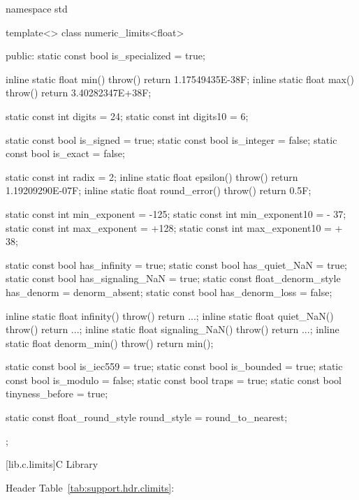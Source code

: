 \pnum
\enterexample
\begin{codeblock}
namespace std {
  template<> class numeric_limits<float> {
  public:
    static const bool is_specialized = true;

    inline static float min() throw() { return 1.17549435E-38F; }
    inline static float max() throw() { return 3.40282347E+38F; }

    static const int digits   = 24;
    static const int digits10 =  6;

    static const bool is_signed  = true;
    static const bool is_integer = false;
    static const bool is_exact   = false;

    static const int radix = 2;
    inline static float epsilon() throw()     { return 1.19209290E-07F; }
    inline static float round_error() throw() { return 0.5F; }

    static const int min_exponent   = -125;
    static const int min_exponent10 = - 37;
    static const int max_exponent   = +128;
    static const int max_exponent10 = + 38;

    static const bool has_infinity             = true;
    static const bool has_quiet_NaN            = true;
    static const bool has_signaling_NaN        = true;
    static const float_denorm_style has_denorm = denorm_absent;
    static const bool has_denorm_loss          = false;

    inline static float infinity()      throw() { return ...; }
    inline static float quiet_NaN()     throw() { return ...; }
    inline static float signaling_NaN() throw() { return ...; }
    inline static float denorm_min()    throw() { return min(); }

    static const bool is_iec559  = true;
    static const bool is_bounded = true;
    static const bool is_modulo  = false;
    static const bool traps      = true;
    static const bool tinyness_before = true;

    static const float_round_style round_style = round_to_nearest;
  };
}
\end{codeblock}
\exitexampleb

[lib.c.limits]{C Library}

\pnum
Header  Table~\ref{tab:support.hdr.climits}:

